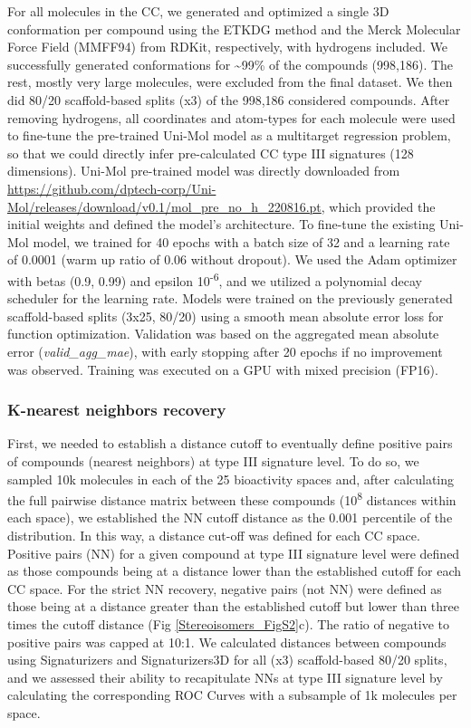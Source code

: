 For all molecules in the CC, we generated and optimized a single 3D conformation per compound using the ETKDG method\cite{riniker_better_2015} and the Merck Molecular Force Field (MMFF94) from RDKit, respectively, with hydrogens included. We successfully generated conformations for \textasciitilde99\% of the compounds (998,186). The rest, mostly very large molecules, were excluded from the final dataset. We then did 80/20 scaffold-based splits (x3) of the 998,186 considered compounds. After removing hydrogens, all coordinates and atom-types for each molecule were used to fine-tune the pre-trained Uni-Mol model as a multitarget regression problem, so that we could directly infer pre-calculated CC type III signatures (128 dimensions). Uni-Mol pre-trained model was directly downloaded from \href{https://github.com/dptech-corp/Uni-Mol/releases/download/v0.1/mol_pre_no_h_220816.pt}{https://github.com/dptech-corp/Uni-Mol/releases/download/v0.1/mol\_pre\_no\_h\_220816.pt}, which provided the initial weights and defined the model’s architecture. To fine-tune the existing Uni-Mol model, we trained for 40 epochs with a batch size of 32 and a learning rate of 0.0001 (warm up ratio of 0.06 without dropout). We used the Adam optimizer with betas (0.9, 0.99) and epsilon 10\textsuperscript{-6}, and we utilized a polynomial decay scheduler for the learning rate. Models were trained on the previously generated scaffold-based splits (3x25, 80/20) using a smooth mean absolute error loss for function optimization. Validation was based on the aggregated mean absolute error (\textit{valid\_agg\_mae}), with early stopping after 20 epochs if no improvement was observed. Training was executed on a GPU with mixed precision (FP16). 

\subsubsection{K-nearest neighbors recovery}

First, we needed to establish a distance cutoff to eventually define positive pairs of compounds (nearest neighbors) at type III signature level. To do so, we sampled 10k molecules in each of the 25 bioactivity spaces and, after calculating the full pairwise distance matrix between these compounds (10\textsuperscript{8} distances within each space), we established the NN cutoff distance as the 0.001 percentile of the distribution. In this way, a distance cut-off was defined for each CC space. Positive pairs (NN) for a given compound at type III signature level were defined as those compounds being at a distance lower than the established cutoff for each CC space. For the strict NN recovery, negative pairs (not NN) were defined as those being at a distance greater than the established cutoff but lower than three times the cutoff distance (Fig \ref{Stereoisomers_FigS2}c). The ratio of negative to positive pairs was capped at 10:1. We calculated distances between compounds using Signaturizers and Signaturizers3D for all (x3) scaffold-based 80/20 splits, and we assessed their ability to recapitulate NNs at type III signature level by calculating the corresponding ROC Curves with a subsample of 1k molecules per space. 

